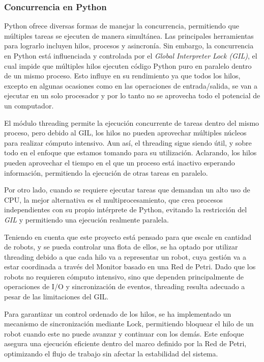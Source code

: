 \subsubsection{Concurrencia en Python}

Python ofrece diversas formas de manejar la concurrencia, permitiendo que múltiples tareas se ejecuten de manera simultánea. Las principales herramientas para lograrlo incluyen hilos, procesos y asincronía. Sin embargo, la concurrencia en Python está influenciada y controlada por el \textit{Global Interpreter Lock (GIL)}, el cual impide que múltiples hilos ejecuten código Python puro en paralelo dentro de un mismo proceso. Esto influye en su rendimiento ya que todos los hilos, excepto en algunas ocasiones como en las operaciones de entrada/salida, se van a ejecutar en un solo procesador y por lo tanto no se aprovecha todo el potencial de un computador. \cite{lanaro2017python}

El módulo threading permite la ejecución concurrente de tareas dentro del mismo proceso, pero debido al GIL, los hilos no pueden aprovechar múltiples núcleos para realizar cómputo intensivo. Aun así, el threading sigue siendo útil, y sobre todo en el enfoque que estamos tomando para su utilización. Aclarando, los hilos pueden aprovechar el tiempo en el que un proceso está inactivo esperando información, permitiendo la ejecución de otras tareas en paralelo.

Por otro lado, cuando se requiere ejecutar tareas que demandan un alto uso de CPU, la mejor alternativa es el multiprocesamiento, que crea procesos independientes con su propio intérprete de Python, evitando la restricción del \textit{GIL} y permitiendo una ejecución realmente paralela.

Teniendo en cuenta que este proyecto está pensado para que escale en cantidad de robots, y se pueda controlar una flota de ellos, se ha optado por utilizar threading debido a que cada hilo va a representar un robot, cuya gestión va a estar coordinada a través del Monitor basado en una Red de Petri. Dado que los robots no requieren cómputo intensivo, sino que dependen principalmente de operaciones de I/O y sincronización de eventos, threading resulta adecuado a pesar de las limitaciones del GIL.

Para garantizar un control ordenado de los hilos, se ha implementado un mecanismo de sincronización mediante Lock, permitiendo bloquear el hilo de un robot cuando este no puede avanzar y continuar con los demás. Este enfoque asegura una ejecución eficiente dentro del marco definido por la Red de Petri, optimizando el flujo de trabajo sin afectar la estabilidad del sistema.